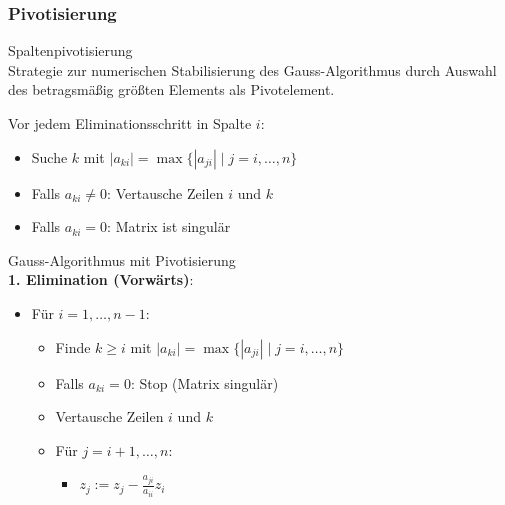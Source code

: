 \vspace{-1mm}
\subsubsection{Pivotisierung}

\begin{concept}{Spaltenpivotisierung}\\
Strategie zur numerischen Stabilisierung des Gauss-Algorithmus durch Auswahl des betragsmäßig größten Elements als Pivotelement.

Vor jedem Eliminationsschritt in Spalte $i$:
\begin{itemize}
    \item Suche $k$ mit $|a_{ki}| = \max\{|a_{ji}| \mid j = i,\ldots,n\}$
    \item Falls $a_{ki} \neq 0$: Vertausche Zeilen $i$ und $k$
    \item Falls $a_{ki} = 0$: Matrix ist singulär
\end{itemize}
\end{concept}

\begin{KR}{Gauss-Algorithmus mit Pivotisierung}\\
\textbf{1. Elimination (Vorwärts)}:
\begin{itemize}
    \item Für $i=1,\ldots,n-1$:
    \begin{itemize}
    \item Finde $k \geq i$ mit $|a_{ki}| = \max\{|a_{ji}| \mid j = i,\ldots,n\}$
    \item Falls $a_{ki} = 0$: Stop (Matrix singulär)
    \item Vertausche Zeilen $i$ und $k$
    \item Für $j=i+1,\ldots,n$:
    \begin{itemize}
    \item $z_j := z_j - \frac{a_{ji}}{a_{ii}}z_i$
    \end{itemize}
    \end{itemize}
\end{itemize}
\vspace{-2mm}
\end{KR}


